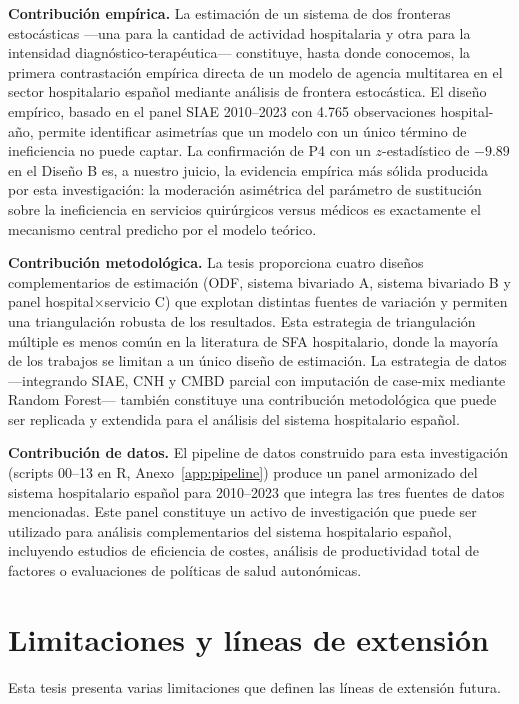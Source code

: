 \documentclass[12pt, a4paper, twoside, openright]{book}
\theoremstyle{plain}
\theoremstyle{definition}
\theoremstyle{remark}
\begin{document}
\textbf{Contribución empírica.} La estimación de un sistema de dos fronteras estocásticas ---una para la cantidad de actividad hospitalaria y otra para la intensidad diagnóstico-terapéutica--- constituye, hasta donde conocemos, la primera contrastación empírica directa de un modelo de agencia multitarea en el sector hospitalario español mediante análisis de frontera estocástica. El diseño empírico, basado en el panel SIAE 2010--2023 con 4.765 observaciones hospital-año, permite identificar asimetrías que un modelo con un único término de ineficiencia no puede captar. La confirmación de P4 con un $z$-estadístico de $-9.89$ en el Diseño B es, a nuestro juicio, la evidencia empírica más sólida producida por esta investigación: la moderación asimétrica del parámetro de sustitución sobre la ineficiencia en servicios quirúrgicos versus médicos es exactamente el mecanismo central predicho por el modelo teórico.

\textbf{Contribución metodológica.} La tesis proporciona cuatro diseños complementarios de estimación (ODF, sistema bivariado A, sistema bivariado B y panel hospital$\times$servicio C) que explotan distintas fuentes de variación y permiten una triangulación robusta de los resultados. Esta estrategia de triangulación múltiple es menos común en la literatura de SFA hospitalario, donde la mayoría de los trabajos se limitan a un único diseño de estimación. La estrategia de datos ---integrando SIAE, CNH y CMBD parcial con imputación de case-mix mediante Random Forest--- también constituye una contribución metodológica que puede ser replicada y extendida para el análisis del sistema hospitalario español.

\textbf{Contribución de datos.} El pipeline de datos construido para esta investigación (scripts 00--13 en R, Anexo~\ref{app:pipeline}) produce un panel armonizado del sistema hospitalario español para 2010--2023 que integra las tres fuentes de datos mencionadas. Este panel constituye un activo de investigación que puede ser utilizado para análisis complementarios del sistema hospitalario español, incluyendo estudios de eficiencia de costes, análisis de productividad total de factores o evaluaciones de políticas de salud autonómicas.

\section{Limitaciones y líneas de extensión}

Esta tesis presenta varias limitaciones que definen las líneas de extensión futura.
\end{document}
